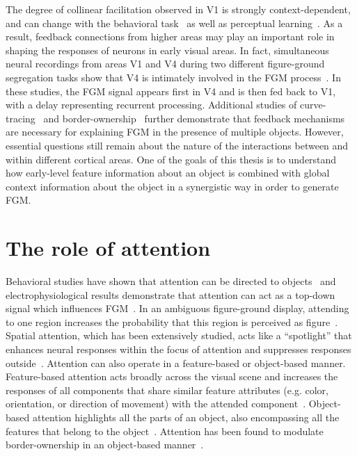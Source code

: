 The degree of collinear facilitation observed in V1 is strongly context-dependent, and can change with the behavioral task~\citep{Li_etal04, Li_etal06} as well as perceptual learning~\citep{Li_etal08a, Yan_etal14}. As a result, feedback connections from higher areas may play an important role in shaping the responses of neurons in early visual areas. In fact, simultaneous neural recordings from areas V1 and V4 during two different figure-ground segregation tasks show that V4 is intimately involved in the FGM process~\citep{Poort_etal12, Chen_etal14}. In these studies, the FGM signal appears first in V4 and is then fed back to V1, with a delay representing recurrent processing. Additional studies of curve-tracing~\citep{Roelfsema_etal98} and border-ownership~\citep{Zhou_etal00, Qiu_etal07, Zhang_vonderHeydt10} further demonstrate that feedback mechanisms are necessary for explaining FGM in the presence of multiple objects. However, essential questions still remain about the nature of the interactions between and within different cortical areas. One of the goals of this thesis is to understand how early-level feature information about an object is combined with global context information about the object in a synergistic way in order to generate FGM.

\section{The role of attention}

Behavioral studies have shown that attention can be directed to objects~\citep{Egly_etal94} and electrophysiological results demonstrate that attention can act as a top-down signal which influences FGM~\citep{Qiu_etal07, Poort_etal12}. In an ambiguous figure-ground display, attending to one region increases the probability that this region is perceived as figure~\citep{Driver_Baylis96, Vecera_etal04}. Spatial attention, which has been extensively studied, acts like a ``spotlight'' that enhances neural responses within the focus of attention and suppresses responses outside~\citep{Motter93a}. Attention can also operate in a feature-based or object-based manner. Feature-based attention acts broadly across the visual scene and increases the responses of all components that share similar feature attributes (e.g. color, orientation, or direction of movement) with the attended component~\citep{Treue_Trujillo99}. Object-based attention highlights all the parts of an object, also encompassing all the features that belong to the object~\citep{Roelfsema_etal98, Schoenfeld_etal14}. Attention has been found to modulate border-ownership in an object-based manner~\citep{Qiu_etal07}.

